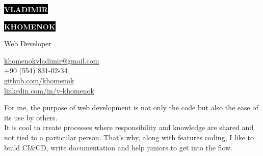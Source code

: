 \documentclass[10pt]{template}
\makeatletter
\newcommand{\cvVarPhone}{+90 (554) 831-02-34}
\newcommand{\cvVarEmail}{khomenokvladimir@gmail.com}
\newcommand{\cvVarGitHub}{khomenok}
\newcommand{\cvVarLinkedIn}{v-khomenok}
\makeatother
\begin{document}
\begin{minipage}[t]{0.55\textwidth}
	\vspace{-\baselineskip}
		
	\colorbox{black}{{\HUGE\textcolor{white}{\textbf{\MakeUppercase{Vladimir}}}}}
		
	\colorbox{black}{{\HUGE\textcolor{white}{\textbf{\MakeUppercase{Khomenok}}}}}
		
	\vspace{6pt}
		
	{\huge Web Developer}
\end{minipage}
\begin{minipage}[t]{0.325\textwidth}
		
	\vspace{-\baselineskip}	
	\href{mailto:\cvVarEmail}{\cvVarEmail}\\
	\cvVarPhone\\
		
	\href{https://github.com/khomenok}{{\color{gray}github.com/}\cvVarGitHub}\\
	\href{https://linkedin.com/in/v-khomenok}{{\color{gray}linkedin.com/in/}\cvVarLinkedIn}
\end{minipage}

\vspace{1cm}

For me, the purpose of web development is not only the code but also the ease of its use by others.\\
It is cool to create processes where responsibility and knowledge are shared and not tied to a particular person. That's why, along with features coding, I like to build CI\&CD, write documentation and help juniors to get into the flow. \\


\end{document}
